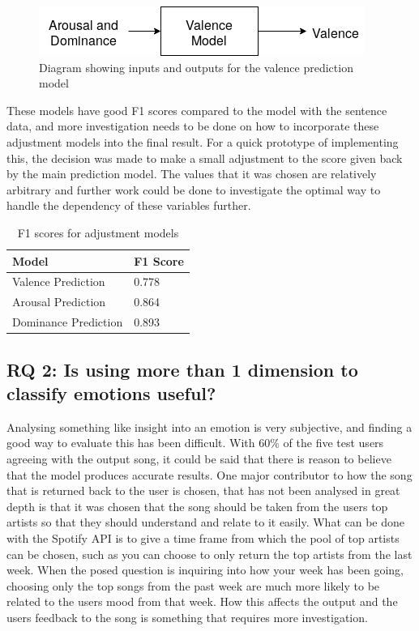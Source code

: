 \begin{figure}[ht]
\centering
\includegraphics[scale=0.6]{implementation/adjustModel.png}
\caption{Diagram showing inputs and outputs for the valence prediction model}
\label{model:adjust}
\end{figure}

These models have good F1 scores compared to the model with the sentence data, and more investigation needs to be done on how to incorporate these adjustment models into the final result. For a quick prototype of implementing this, the decision was made to make a small adjustment to the score given back by the main prediction model. The values that it was chosen are relatively arbitrary and further work could be done to investigate the optimal way to handle the dependency of these variables further.


\begin{table}[h]
\centering
\caption{F1 scores for adjustment models}
\begin{tabular}{|l|l|}
\hline
Model & F1 Score \\ \hline
 Valence Prediction &  0.778\\
 Arousal Prediction &  0.864\\
 Dominance Prediction &  0.893\\
 \hline
\end{tabular}
\label{f1:adj}
\end{table}

\subsection{RQ 2: Is using more than 1 dimension to classify emotions useful?}

Analysing something like insight into an emotion is very subjective, and finding a good way to evaluate this has been difficult. With 60\% of the five test users agreeing with the output song, it could be said that there is reason to believe that the model produces accurate results. One major contributor to how the song that is returned back to the user is chosen, that has not been analysed in great depth is that it was chosen that the song should be taken from the users top artists so that they should understand and relate to it easily. What can be done with the Spotify API is to give a time frame from which the pool of top artists can be chosen, such as you can choose to only return the top artists from the last week. When the posed question is inquiring into how your week has been going, choosing only the top songs from the past week are much more likely to be related to the users mood from that week. How this affects the output and the users feedback to the song is something that requires more investigation. 

